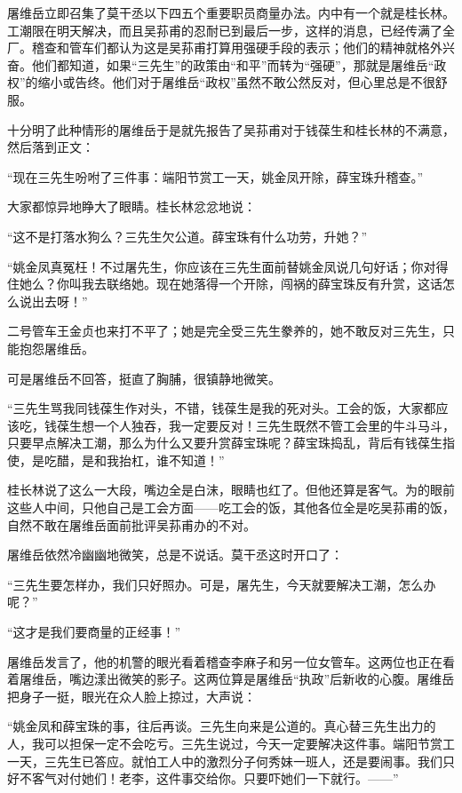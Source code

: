 \par 屠维岳立即召集了莫干丞以下四五个重要职员商量办法。内中有一个就是桂长林。工潮限在明天解决，而且吴荪甫的忍耐已到最后一步，这样的消息，已经传满了全厂。稽查和管车们都认为这是吴荪甫打算用强硬手段的表示；他们的精神就格外兴奋。他们都知道，如果“三先生”的政策由“和平”而转为“强硬”，那就是屠维岳“政权”的缩小或告终。他们对于屠维岳“政权”虽然不敢公然反对，但心里总是不很舒服。
\par 十分明了此种情形的屠维岳于是就先报告了吴荪甫对于钱葆生和桂长林的不满意，然后落到正文：
\par “现在三先生吩咐了三件事：端阳节赏工一天，姚金凤开除，薛宝珠升稽查。”
\par 大家都惊异地睁大了眼睛。桂长林忿忿地说：
\par “这不是打落水狗么？三先生欠公道。薛宝珠有什么功劳，升她？”
\par “姚金凤真冤枉！不过屠先生，你应该在三先生面前替姚金凤说几句好话；你对得住她么？你叫我去联络她。现在她落得一个开除，闯祸的薛宝珠反有升赏，这话怎么说出去呀！”
\par 二号管车王金贞也来打不平了；她是完全受三先生豢养的，她不敢反对三先生，只能抱怨屠维岳。
\par 可是屠维岳不回答，挺直了胸脯，很镇静地微笑。
\par “三先生骂我同钱葆生作对头，不错，钱葆生是我的死对头。工会的饭，大家都应该吃，钱葆生想一个人独吞，我一定要反对！三先生既然不管工会里的牛斗马斗，只要早点解决工潮，那么为什么又要升赏薛宝珠呢？薛宝珠捣乱，背后有钱葆生指使，是吃醋，是和我抬杠，谁不知道！”
\par 桂长林说了这么一大段，嘴边全是白沫，眼睛也红了。但他还算是客气。为的眼前这些人中间，只他自己是工会方面——吃工会的饭，其他各位全是吃吴荪甫的饭，自然不敢在屠维岳面前批评吴荪甫办的不对。
\par 屠维岳依然冷幽幽地微笑，总是不说话。莫干丞这时开口了：
\par “三先生要怎样办，我们只好照办。可是，屠先生，今天就要解决工潮，怎么办呢？”
\par “这才是我们要商量的正经事！”
\par 屠维岳发言了，他的机警的眼光看着稽查李麻子和另一位女管车。这两位也正在看着屠维岳，嘴边漾出微笑的影子。这两位算是屠维岳“执政”后新收的心腹。屠维岳把身子一挺，眼光在众人脸上掠过，大声说：
\par “姚金凤和薛宝珠的事，往后再谈。三先生向来是公道的。真心替三先生出力的人，我可以担保一定不会吃亏。三先生说过，今天一定要解决这件事。端阳节赏工一天，三先生已答应。就怕工人中的激烈分子何秀妹一班人，还是要闹事。我们只好不客气对付她们！老李，这件事交给你。只要吓她们一下就行。——”
